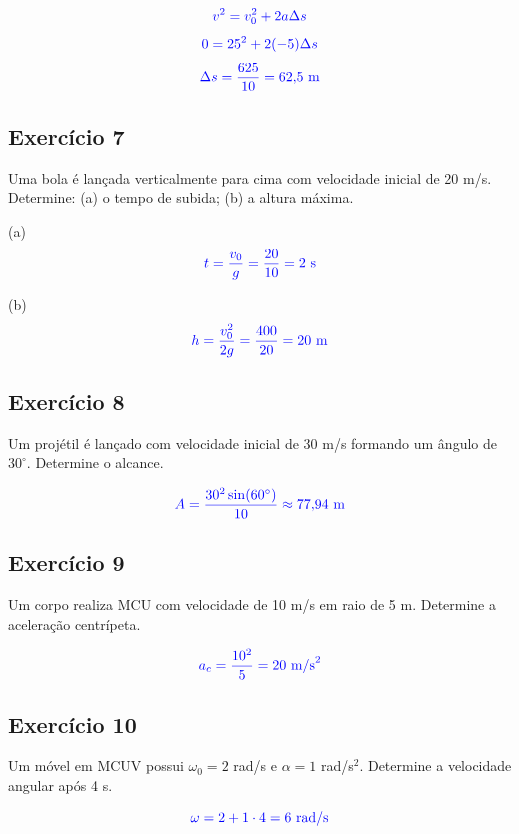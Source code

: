 \documentclass[a4paper,12pt]{article}
\newcommand{\printingbibliography}{%

    \pagestyle{myheadings}
    \markright{}
    \sloppy
    \printbibliography[heading=bibintoc, %
                   title=Refer\^encias %
                  ]
    \fussy%
}
\begin{document}
\[
\textcolor{blue}{v^2 = v_0^2 + 2a\Delta s}
\]
\[
\textcolor{blue}{0 = 25^2 + 2(-5)\Delta s}
\]
\[
\textcolor{blue}{\Delta s = \frac{625}{10} = 62{,}5\ \text{m}}
\]

\subsection*{Exercício 7}
Uma bola é lançada verticalmente para cima com velocidade inicial de 20 m/s. Determine:
(a) o tempo de subida; (b) a altura máxima.

(a)
\[
\textcolor{blue}{t = \frac{v_0}{g} = \frac{20}{10} = 2\ \text{s}}
\]

(b)
\[
\textcolor{blue}{h = \frac{v_0^2}{2g} = \frac{400}{20} = 20\ \text{m}}
\]

\subsection*{Exercício 8}
Um projétil é lançado com velocidade inicial de 30 m/s formando um ângulo de $30^\circ$. Determine o alcance.

\[
\textcolor{blue}{A = \frac{30^2 \sin(60^\circ)}{10} \approx 77{,}94\ \text{m}}
\]

\subsection*{Exercício 9}
Um corpo realiza MCU com velocidade de 10 m/s em raio de 5 m. Determine a aceleração centrípeta.

\[
\textcolor{blue}{a_c = \frac{10^2}{5} = 20\ \text{m/s}^2}
\]

\subsection*{Exercício 10}
Um móvel em MCUV possui $\omega_0 = 2$ rad/s e $\alpha = 1$ rad/s$^2$. Determine a velocidade angular após 4 s.

\[
\textcolor{blue}{\omega = 2 + 1 \cdot 4 = 6\ \text{rad/s}}
\]

\end{document}
